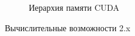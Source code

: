 \documentclass[a4paper,14pt,russian]{extreport}
\begin{document}
  \begin{figure}[h]
  \caption{Иерархия памяти CUDA}
  \label{ris:mem_hierarchy}
  \end{figure}
\par Вычислительные возможности 2.x
\end{document}
